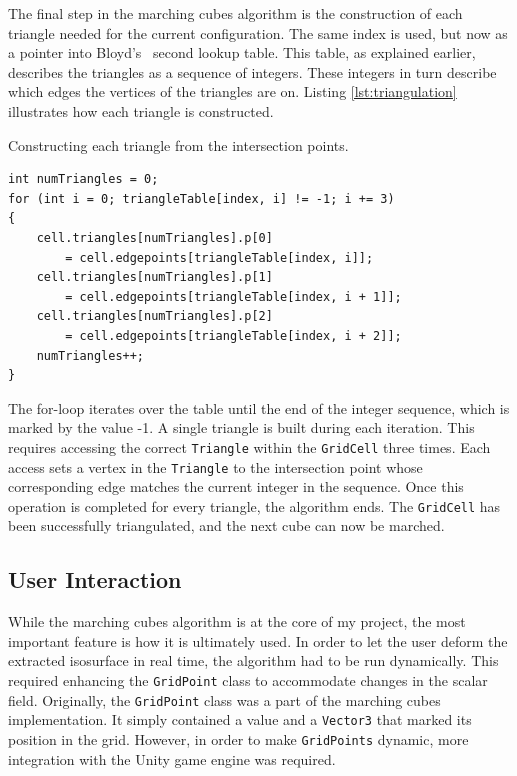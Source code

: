 \documentclass[pageno]{jpaper}
\begin{document}
The final step in the marching cubes algorithm is the construction of each triangle needed for the current configuration. The same index is used, but now as a pointer into Bloyd's~\cite{bloyd} second lookup table. This table, as explained earlier, describes the triangles as a sequence of integers. These integers in turn describe which edges the vertices of the triangles are on. Listing \ref{lst:triangulation} illustrates how each triangle is constructed.

\begin{listing}[H]
\linespread{1.0}
\caption{Constructing each triangle from the intersection points.}
\begin{verbatim}
int numTriangles = 0;
for (int i = 0; triangleTable[index, i] != -1; i += 3)
{
    cell.triangles[numTriangles].p[0]
        = cell.edgepoints[triangleTable[index, i]];
    cell.triangles[numTriangles].p[1]
        = cell.edgepoints[triangleTable[index, i + 1]];
    cell.triangles[numTriangles].p[2]
        = cell.edgepoints[triangleTable[index, i + 2]];
    numTriangles++;
}
\end{verbatim}
\label{lst:triangulation}
\end{listing}

The for-loop iterates over the table until the end of the integer sequence, which is marked by the value -1. A single triangle is built during each iteration. This requires accessing the correct \texttt{Triangle} within the \texttt{GridCell} three times. Each access sets a vertex in the \texttt{Triangle} to the intersection point whose corresponding edge matches the current integer in the sequence. Once this operation is completed for every triangle, the algorithm ends. The \texttt{GridCell} has been successfully triangulated, and the next cube can now be marched.

\subsection{User Interaction}

While the marching cubes algorithm is at the core of my project, the most important feature is how it is ultimately used. In order to let the user deform the extracted isosurface in real time, the algorithm had to be run dynamically. This required enhancing the \texttt{GridPoint} class to accommodate changes in the scalar field. Originally, the \texttt{GridPoint} class was a part of the marching cubes implementation. It simply contained a value and a \texttt{Vector3} that marked its position in the grid. However, in order to make \texttt{GridPoints} dynamic, more integration with the Unity game engine was required. 
\end{document}
